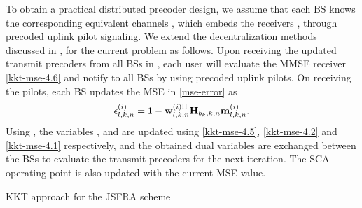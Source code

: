 To obtain a practical distributed precoder design, we assume that each \ac{BS}  knows the corresponding equivalent channels , which embeds the receivers , through precoded uplink pilot signaling. We extend the decentralization methods discussed in \cite{komulainen2013effective}, for the current problem as follows. Upon receiving the updated transmit precoders from all \acp{BS} in , each user will evaluate the \ac{MMSE} receiver \eqref{kkt-mse-4.6} and notify to all \acp{BS} by using precoded uplink pilots. On receiving the pilots, each \ac{BS} updates the \ac{MSE} in \eqref{mse-error} as 
\begin{equation}
\epsilon_{l,k,n}^{(i)} = 1 - \mathbf{w}_{l,k,n}^{(i)\mathrm{H}} \mathbf{H}_{b_k,k,n} \mathbf{m}_{l,k,n}^{(i)}.
\end{equation}
Using , the variables , and  are updated using \eqref{kkt-mse-4.5}, \eqref{kkt-mse-4.2} and \eqref{kkt-mse-4.1} respectively, and the obtained dual variables  are exchanged between the \acp{BS} to evaluate the transmit precoders  for the next iteration. The \ac{SCA} operating point is also updated with the current \ac{MSE} value.
\begin{algorithm}
	\SetAlgoLined
	\DontPrintSemicolon
	\BlankLine
	\caption{\ac{KKT} approach for the \ac{JSFRA} scheme}
	\label{algo-4}
\end{algorithm}

